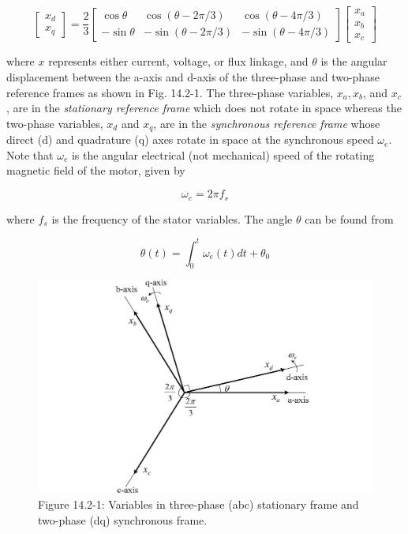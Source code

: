 \documentclass[letterpaper,12pt]{article}
\begin{document}
\begin{equation}
\begin{bmatrix}
x_d \\
x_q
\end{bmatrix}
=
\frac{2}{3}
\begin{bmatrix}
\cos \theta & \cos(\theta - 2\pi/3) & \cos(\theta - 4\pi/3) \\
-\sin \theta & -\sin(\theta - 2\pi/3) & -\sin(\theta - 4\pi/3)
\end{bmatrix}
\begin{bmatrix}
x_a \\
x_b \\
x_c
\end{bmatrix} \tag{14.2-1}
\end{equation} 

where $x$ represents either current, voltage, or flux linkage, and $\theta$ is the angular displacement between the a-axis and d-axis of the three-phase and two-phase reference frames as shown in Fig. 14.2-1. The three-phase variables, $x_a, x_b$, and $x_c$, are in the \textit{stationary reference frame} which does not rotate in space whereas the two-phase variables, $x_d$ and $x_q$, are in the \textit{synchronous reference frame} whose direct (d) and quadrature (q) axes rotate in space at the synchronous speed $\omega_e$. Note that $\omega_e$ is the angular electrical (not mechanical) speed of the rotating magnetic field of the motor, given by

\begin{equation}
\omega_e = 2 \pi f_s \tag{14.2-2}
\end{equation} 

where $f_s$ is the frequency of the stator variables. The angle $\theta$ can be found from

\begin{equation}
\theta(t) = \int_{0}^{t} \omega_e(t) dt + \theta_0 \tag{14.2-3}
\end{equation} 

\begin{figure}[h]
\centering
\includegraphics{graficos/img01.jpg}
\caption{Figure 14.2-1: Variables in three-phase (abc) stationary frame and two-phase (dq) synchronous frame.}
\end{figure}
\FloatBarrier
\end{document}
